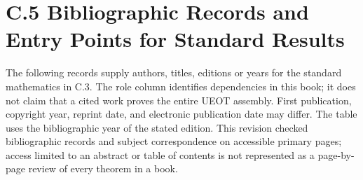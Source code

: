 \documentclass[
  english,
  11pt,
  oneside]{book}
\begin{document}
\section{C.5 Bibliographic Records and Entry Points for Standard Results}\label{c.5-bibliographic-records-and-entry-points-for-standard-results}

The following records supply authors, titles, editions or years for the standard mathematics in C.3. The role column identifies dependencies in this book; it does not claim that a cited work proves the entire UEOT assembly. First publication, copyright year, reprint date, and electronic publication date may differ. The table uses the bibliographic year of the stated edition. This revision checked bibliographic records and subject correspondence on accessible primary pages; access limited to an abstract or table of contents is not represented as a page-by-page review of every theorem in a book.
\end{document}
